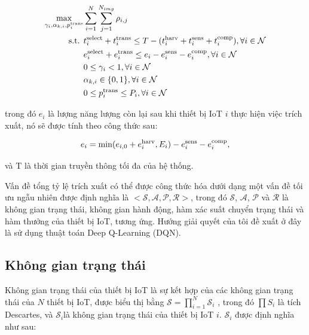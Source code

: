 \documentclass{article} %
\begin{document}
\begin{subequations}\label{extrac_rate_opt_pro}
	\begin{align}
	\label{op1}
       \max_{{\gamma}_{i},{\alpha}_{k, i}, p_i^{\rm{trans}}} & \sum_{i=1}^{N} \sum_{j=1}^{N_{img}}  \rho_{i,j}\\
        \text{s.t.   } &
         t^{\rm{select}}_i + t^{\rm{trans}}_i \leq T - (t^{\rm{harv}}_i + t^{\rm{sens}}_i + t^{\rm{comp}}_i) ,
        \forall i \in \mathcal{N} \label{time_cons}\\
        &
         e^{\rm{select}}_i + e^{\rm{trans}}_i \leq e_i - e^{\rm{sens}}_i  - e^{\rm{comp}}_i, \forall i \in \mathcal{N} \label{energy_cons}\\
         &
        0 \leq {\gamma}_{i} < 1, \forall i \in \mathcal{N} \label{energy_cons}\\
         &
        {\alpha}_{k, i} \in \{0, 1\}, \forall i \in \mathcal{N} \label{energy_cons}\\
        &
        0 \leq p_i^{\rm{trans}} \leq P_i, \forall i \in \mathcal{N} \label{powertrans_cons}
	\end{align}
\end{subequations}

trong đó $e_i$ là lượng năng lượng còn lại sau khi thiết bị IoT $i$ thực hiện việc trích xuất, nó sẽ được tính theo công thức sau:

\begin{equation}
\label{c_1}
e_i = \min(e_{i, 0} + e_i^{\rm{harv}}, E_i) - e_i^{\rm{sens}} - e_i^{\rm{comp}},
\end{equation}

và $\mathrm{T}$ là thời gian truyền thông tối đa của hệ thống.

Vấn đề tổng tỷ lệ trích xuất có thể được công thức hóa dưới dạng một vấn đề tối ưu ngẫu nhiên được định nghĩa là $<{\mathcal{S}}, {\mathcal{A}}, {\mathcal{ P}}, {\mathcal{R}} >$, trong đó ${\mathcal{S}}$, ${\mathcal{A}}$, ${\mathcal{P}}$ và ${\mathcal {R}}$ là không gian trạng thái, không gian hành động, hàm xác suất chuyển trạng thái và hàm thưởng của thiết bị IoT, tương ứng. Hướng giải quyết của tôi đề xuất ở đây là sử dụng thuật toán Deep Q-Learning (DQN).

\subsection{Không gian trạng thái}
Không gian trạng thái của thiết bị IoT là sự kết hợp của các không gian trạng thái của ${N}$ thiết bị IoT, được biểu thị bằng $\mathcal{S} = \prod_{i=1}^{N}\mathcal{S}_i$ , trong đó $\prod S_i$ là tích Descartes, và $\mathcal{S}_{i} $là không gian trạng thái của thiết bị IoT $i$. $\mathcal{S}_{i}$ được định nghĩa như sau:
\end{document}
